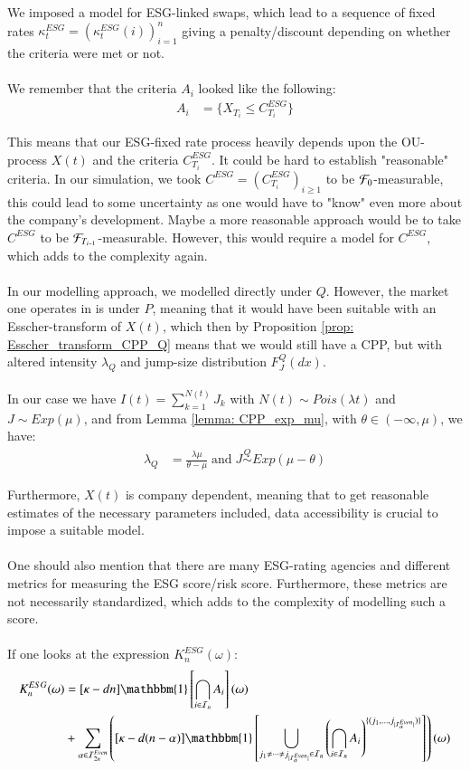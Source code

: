 \newpage 
We imposed a model for ESG-linked swaps, which lead to a sequence of fixed rates $\kappa_{t}^{ESG}  = (\kappa_{t}^{ESG}(i))_{i=1}^{n}$ giving a penalty/discount depending on whether the criteria were met or not.
\\~\\ 
We remember that the criteria $A_{i}$ looked like the following:
\begin{align*}
A_{i} &= \{X_{T_{i}} \leq C_{T_{i}}^{ESG}\}    
\end{align*}

This means that our ESG-fixed rate process heavily depends upon the OU-process $X(t)$ and the criteria $C_{T_{i}}^{ESG}$. It could be hard to establish "reasonable" criteria. In our simulation, we took $C^{ESG} = (C_{T_{i}}^{ESG})_{i\geq 1}$ to be $\mathcal{F}_{0}$-measurable, this could lead to some uncertainty as one would have to "know" even more about the company's development. Maybe a more reasonable approach would be to take $C^{ESG}$ to be $\mathcal{F}_{T_{i-1}}$-measurable. However, this would require a model for $C^{ESG}$, which adds to the complexity again.    
\\~\\
In our modelling approach, we modelled directly under $Q$. However, the market one operates in is under $P$, meaning that it would have been suitable with an Esscher-transform of $X(t)$, which then by  Proposition \ref{prop: Esscher_transform_CPP_Q} means that we would still have a CPP, but with altered intensity $\lambda_{Q}$ and jump-size distribution $F_{J}^{Q}(dx)$.
\\~\\
In our case we have $I(t) = \sum_{k=1}^{N(t)}J_{k}$ with $N(t) \sim Pois(\lambda t)$ and 
$J\sim Exp(\mu)$, and from Lemma \ref{lemma: CPP_exp_mu}, with $\theta \in (-\infty, \mu)$, we have:
\begin{align*}
\lambda_{Q} &= \frac{\lambda \mu}{\theta - \mu} \;\text{and}\;
J \stackrel{Q}{\sim} Exp(\mu - \theta)
\end{align*}

Furthermore, $X(t)$ is company dependent, meaning that to get reasonable estimates of the necessary parameters included, data accessibility is crucial to impose a suitable model. 
\\~\\ 
One should also mention that there are many ESG-rating agencies and different metrics for measuring the ESG score/risk score. Furthermore, these metrics are not necessarily standardized, which adds to the complexity of modelling such a score. 
\\~\\
If one looks at the expression $K_{n}^{ESG}(\omega)$: 
\begin{align*}
K_{n}^{ESG}(\omega) &= 
[\kappa -dn]\mathbbm{1}\left[
\bigcap_{i\in \mathcal{I}_{n}}A_{i}
\right](\omega) \\ 
&+ 
\sum_{\alpha \in \mathcal{I}_{2n}^{Even}}
\left(
[\kappa -d(n-\alpha)]\mathbbm{1}\left[
\bigcup_{
j_{1}\neq \dots \neq j_{|\mathcal{I}_{\alpha}^{Even}|}
\in \mathcal{I}_{n}
}\left(
\bigcap_{i\in \mathcal{I}_{n}}A_{i}
\right)^{
\{
(j_{1}, \dots , j_{|\mathcal{I}_{\alpha}^{Even}|})
\}
}
\right]
\right)(\omega) 
\end{align*}


